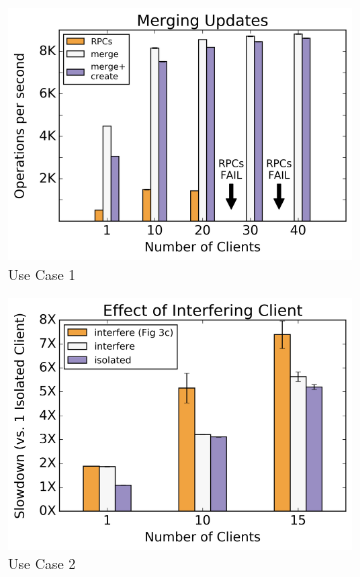 \begin{figure}[t]
  \centering
  \begin{subfigure}[b]{.3\linewidth}
      \centering
      \includegraphics[width=1.0\linewidth]{graphs/mergescale.png}
      \caption{Use Case 1} \label{fig:mergescale}
  \end{subfigure}
  \begin{subfigure}[b]{.3\linewidth}
      \centering
      \includegraphics[width=1.0\linewidth]{graphs/block-allow.png}
      \caption{Use Case 2}
      \label{fig:block-allow}
  \end{subfigure}
  \begin{subfigure}[b]{.3\linewidth}
      \centering

\end{subfigure}
\end{figure}
